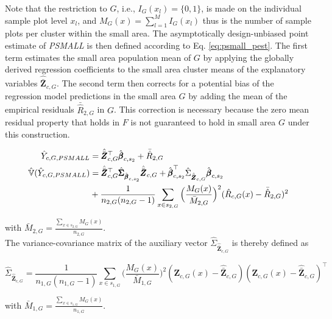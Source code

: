 Note that the restriction to $G$, i.e., $I_{G}(x_l)=\{0,1\}$, is made on the individual sample plot level $x_l$, and $M_{G}(x) = \sum_{l=1}^{M}I_{G}(x_l)$ thus is the number of sample plots per cluster within the small area. The asymptotically design-unbiased point estimate of \textit{PSMALL} is then defined according to Eq. \ref{eq:psmall_pest}. The first term estimates the small area population mean of $G$ by applying the globally derived regression coefficients to the small area cluster means of the explanatory variables $\hat{\bar{\pmb{Z}}}_{c,G}$. The second term then corrects for a potential bias of the regression model predictions in the small area $G$ by adding the mean of the empirical residuals $\bar{\hat{R}}_{2,G}$ in $G$. This correction is necessary because the zero mean residual property that holds in $F$ is not guaranteed to hold in small area $G$ under this construction.

\begin{subequations}\label{eq:psmall}
	\begin{align}
	\hat{Y}_{c,G,PSMALL} &= \hat{\bar{\pmb{Z}}}_{c,G}^{\top}\hat{\pmb{\beta}}_{c,s_2} + \bar{\hat{R}}_{2,G} \label{eq:psmall_pest} \\
	\hat{\mathbb{V}}(\hat{Y}_{c,G,PSMALL}) & = \hat{\bar{\pmb{Z}}}_{c,G}^{\top}\hat{\pmb{\Sigma}}_{\hat{\pmb{\beta}}_{c,s_2}}\hat{\bar{\pmb{Z}}}_{c,G}
	+ \hat{\pmb{\beta}}_{c,s_2}^{\top}\hat{\Sigma}_{\hat{\bar{\pmb{Z}}}_{c,G}}\hat{\pmb{\beta}}_{c,s_2} \nonumber \\
	& + \frac{1}{n_{2,G}(n_{2,G}-1)}\sum_{x \in s_{2,G}}\Big(\frac{M_{G}(x)}{\bar{M}_{2,G}}\Big)^2(\hat{R}_{c,G}(x) - \bar{\hat{R}}_{2,G})^2
	\label{eq:psmallvar}
	\end{align}
\end{subequations}

\noindent with $\bar{M}_{2,G}=\frac{\sum_{x \in s_{2,G}}M_{G}(x)}{n_{2,G}}$.\\

The variance-covariance matrix of the auxiliary vector $\hat{\Sigma}_{\hat{\bar{\pmb{Z}}}_{c,G}}$ is thereby defined as

\begin{equation}\label{estvarcovaux_G}
\hat{\Sigma}_{\hat{\bar{\pmb{Z}}}_{c,G}} = \frac{1}{n_{1,G}(n_{1,G}-1)} \sum_{x \in s_{1,G}} \big(\frac{M_{G}(x)}{\bar{M}_{1,G}}\big)^2 (\pmb{Z}_{c,G}(x)-\hat{\bar{\pmb{Z}}}_{c,G})(\pmb{Z}_{c,G}(x)-\hat{\bar{\pmb{Z}}}_{c,G})^{\top}
\end{equation}

\noindent with $\bar{M}_{1,G}=\frac{\sum_{x \in s_{1,G}}M_{G}(x)}{n_{1,G}}$.\\

